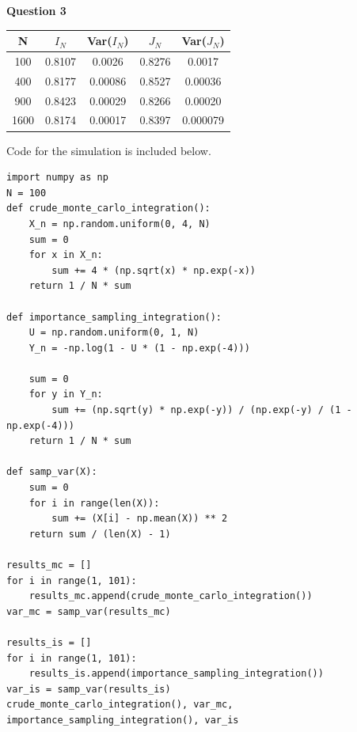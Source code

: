 \documentclass[12pt, letterpaper]{article}
\begin{document}
\noindent \textbf{Question 3} \\
    \begin{center}
    \begin{tabular}{c | c c | c c}
        N & $I_N$ & Var($I_N$) & $J_N$ & Var($J_N$) \\
        \hline 
        100 & 0.8107 & 0.0026 & 0.8276 & 0.0017 \\
        400 & 0.8177 & 0.00086 & 0.8527 & 0.00036 \\
        900 & 0.8423 & 0.00029 & 0.8266 & 0.00020 \\
        1600 & 0.8174 & 0.00017 & 0.8397 & 0.000079 \\
    \end{tabular}
    \end{center}
Code for the simulation is included below.
    \begin{verbatim}
import numpy as np
N = 100
def crude_monte_carlo_integration():
    X_n = np.random.uniform(0, 4, N)
    sum = 0
    for x in X_n:
        sum += 4 * (np.sqrt(x) * np.exp(-x))
    return 1 / N * sum

def importance_sampling_integration():
    U = np.random.uniform(0, 1, N)
    Y_n = -np.log(1 - U * (1 - np.exp(-4)))

    sum = 0
    for y in Y_n:
        sum += (np.sqrt(y) * np.exp(-y)) / (np.exp(-y) / (1 - np.exp(-4)))
    return 1 / N * sum

def samp_var(X):
    sum = 0
    for i in range(len(X)):
        sum += (X[i] - np.mean(X)) ** 2
    return sum / (len(X) - 1)

results_mc = []
for i in range(1, 101):
    results_mc.append(crude_monte_carlo_integration())
var_mc = samp_var(results_mc)

results_is = []
for i in range(1, 101):
    results_is.append(importance_sampling_integration())
var_is = samp_var(results_is)
crude_monte_carlo_integration(), var_mc, importance_sampling_integration(), var_is
    \end{verbatim}
\end{document}
